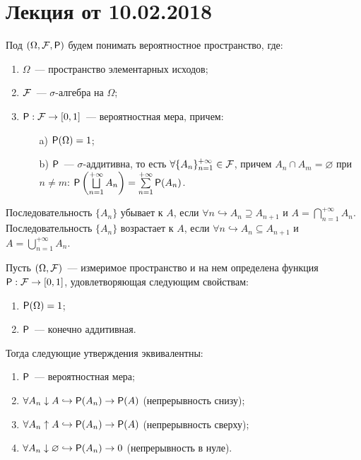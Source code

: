 \section{Лекция от 10.02.2018}
\begin{definition}
    Под $(\Omega, \F, \P)$ будем понимать вероятностное пространство, где:
    \begin{enumerate}
    	\item $\Omega$~--- пространство элементарных исходов;
    	\item $\F$~--- $\sigma$-алгебра на $\Omega$;
    	\item{$\P: \F \rightarrow [0, 1]$~--- вероятностная мера, причем:
    		\begin{enumerate}
    			\item[a)] $\P (\Omega) = 1$;
    			\item[b)] $\P$~--- $\sigma$-аддитивна, то есть $\forall \{A_n\}_{n = 1}^{+\infty} \in \F$, причем $A_n \cap A_m = \varnothing$ при $n \neq m$: $\P \left( \bigsqcup\limits_{n=1}^{+\infty} A_n \right) = \sum \limits_{n = 1}^{+\infty} \P (A_n)$.
    		\end{enumerate}
    	}
    \end{enumerate}
\end{definition}

\begin{definition}
	Последовательность $\{A_n\}$ убывает к $A$, если $\forall n \hookrightarrow A_{n} \supseteq A_{n+1}$ и   $A = \bigcap\limits_{n = 1}^{+\infty} A_n$.
	Последовательность $\{A_n\}$ возрастает к $A$, если $\forall n \hookrightarrow A_{n} \subseteq A_{n+1}$ и   $A = \bigcup\limits_{n = 1}^{+\infty} A_n$.
\end{definition}

\begin{theorem}
	Пусть $(\Omega, \F )$~--- измеримое пространство и на нем определена функция $\P: \F \rightarrow [0,1]$, удовлетворяющая следующим свойствам: 
	\begin{enumerate}
	    \item $\P (\Omega) = 1$;
	    \item  $\P$~--- конечно аддитивная.
	\end{enumerate} 
	Тогда следующие утверждения эквивалентны:
	\begin{enumerate}
		\item $\P$~--- вероятностная мера;
		\item $\forall A_n \downarrow A \hookrightarrow \P (A_n) \rightarrow \P(A)$ (непрерывность снизу);
		\item $\forall A_n \uparrow A \hookrightarrow \P (A_n) \rightarrow \P(A)$ (непрерывность сверху);
		\item  $\forall A_n \downarrow \varnothing \hookrightarrow \P (A_n) \rightarrow 0$ (непрерывность в нуле).
	\end{enumerate}
\end{theorem}

